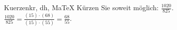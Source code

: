 \begin{MAufgabe}{Kuerzen}{kr, dh, MaTeX}
K\"urzen Sie soweit m\"oglich: $\frac{1020}{825}$.\\ 
\ifLsg\MLoesung
\quad $\frac{1020}{825}=\frac{(15)\cdot(68)}{(15)\cdot(55)}=\frac{68}{55}$.\else\relax\fi
 \end{MAufgabe}